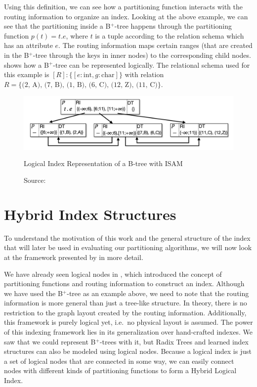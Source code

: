 \noindent Using this definition, we can see how a partitioning function interacts with the routing information to organize an index. Looking at the above example, we can see that the partitioning inside a B$^+$-tree happens through the partitioning function $p(t) = t.e$, where $t$ is a tuple according to the relation schema which has an attribute $e$. The routing information maps certain ranges (that are created in the B$^+$-tree through the keys in inner nodes) to the corresponding child nodes.  shows how a B$^+$-tree can be represented logically. The relational schema used for this example is $[R] : \{ [e:\text{int}, g:\text{char}] \}$ with relation $R = \{ \text{(2, A), (7, B), (1, B), (6, C), (12, Z), (11, C)}\}$.

\begin{figure}
    \centering
    \includegraphics[width=\textwidth]{figures/logical_btree.png}
    \caption{Logical Index Representation of a B-tree with ISAM}
    \caption*{\hfill Source: \citeauthor{Dittrich2021} \cite{Dittrich2021}}
    \label{fig:logical_btree}
\end{figure}

\section{Hybrid Index Structures}\label{bg:hybrid}
To understand the motivation of this work and the general structure of the index that will later be used in evaluating our partitioning algorithms, we will now look at the framework presented by \citeauthor{Dittrich2021} \cite{Dittrich2021} in more detail.

We have already seen logical nodes in , which introduced the concept of partitioning functions and routing information to construct an index. Although we have used the B$^+$-tree as an example above, we need to note that the routing information is more general than just a tree-like structure. In theory, there is no restriction to the graph layout created by the routing information. Additionally, this framework is purely logical yet, i.e.~no physical layout is assumed. The power of this indexing framework lies in its generalization over hand-crafted indexes. We saw that we could represent B$^+$-trees with it, but Radix Trees and learned index structures can also be modeled using logical nodes. Because a logical index is just a set of logical nodes that are connected in some way, we can easily connect nodes with different kinds of partitioning functions to form a Hybrid Logical Index. 

